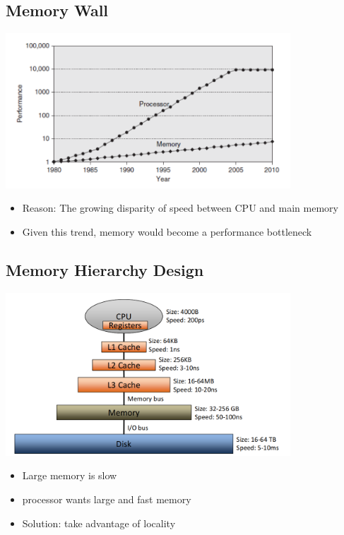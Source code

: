 \documentclass[12pt]{article}
\begin{document}
\subsection{Memory Wall}
\includegraphics[width=0.8\textwidth]{MemoryWall.png}
\begin{itemize}
    \item Reason: The growing disparity of speed between CPU and main memory
    \item Given this trend, memory would become a performance bottleneck
\end{itemize}
\subsection{Memory Hierarchy Design}
\includegraphics[width=0.8\textwidth]{MemoryHierarchy.png}
\begin{itemize}
    \item Large memory is slow
    \item processor wants large and fast memory
    \item Solution: take advantage of locality
\end{itemize}
\end{document}
